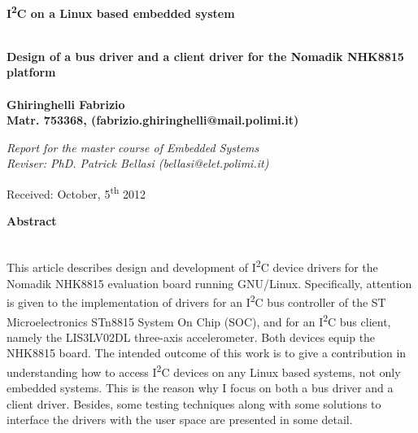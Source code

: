 \documentclass[a4paper,10pt]{article}
\newenvironment*{mytitle}{\begin{LARGE}\bf}{\end{LARGE}\\}%
\newenvironment*{mysubtitle}{\bf}{\\[1.5ex]}%
\newenvironment*{myabstract}{\begin{Large}\bf}{\end{Large}\\[2.5ex]}%
\newcommand{\iic}{I\textsuperscript{2}C }
\begin{document}
\begin{mytitle}\iic on a Linux based embedded system\end{mytitle}
\begin{mysubtitle}
Design of a bus driver and a client driver for the Nomadik NHK8815 platform
\end{mysubtitle}
%
%
\\
Ghiringhelli Fabrizio\\
Matr. 753368, (fabrizio.ghiringhelli@mail.polimi.it)\\
\hspace{10ex}
\begin{flushright}
\emph{Report for the master course of Embedded Systems}\\
\emph{Reviser: PhD. Patrick Bellasi (bellasi@elet.polimi.it)}
\end{flushright}

Received: October, 5\textsuperscript{th} 2012\\
\hspace{10ex}


\begin{myabstract} Abstract \end{myabstract}
This article describes design and development of \iic device drivers for
the Nomadik NHK8815 evaluation board running GNU/Linux. Specifically, attention
is given to the implementation of drivers for an \iic bus controller of the ST
Microelectronics STn8815 System On Chip (SOC), and for an \iic bus client, namely 
the LIS3LV02DL three-axis accelerometer. Both devices equip the NHK8815 board.
The intended outcome of this work is to give a contribution in understanding how
to access \iic devices on any Linux based systems, not only embedded systems.
This is the reason why I focus on both a bus driver and a client driver.
Besides, some testing techniques along with some solutions to interface the
drivers with the user space are presented in some detail.
\end{document}
